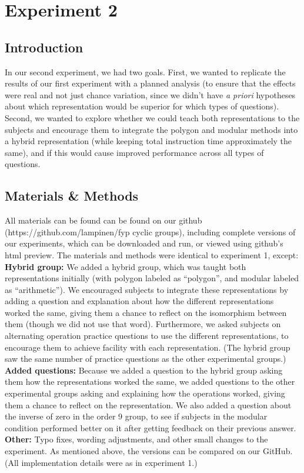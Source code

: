 \documentclass[11pt]{article}
\begin{document}
\section{Experiment 2}
\subsection{Introduction}
In our second experiment, we had two goals. First, we wanted to replicate the results of our first experiment with a planned analysis (to ensure that the effects were real and not just chance variation, since we didn't have \textit{a priori} hypotheses about which representation would be superior for which types of questions). Second, we wanted to explore whether we could teach both representations to the subjects and encourage them to integrate the polygon and modular methods into a hybrid representation (while keeping total instruction time approximately the same), and if this would cause improved performance across all types of questions. %
\subsection{Materials \& Methods} 
All materials can be found can be found on our github (https://github.com/lampinen/fyp cyclic groups), including complete versions of our experiments, which can be downloaded and run, or viewed using github's html preview. The materials and methods were identical to experiment 1, except:\\[11pt]
\textbf{Hybrid group:} We added a hybrid group, which was taught both representations initially (with polygon labeled as ``polygon'', and modular labeled as ``arithmetic''). We encouraged subjects to integrate these representations by adding a question and explanation about how the different representations worked the same, giving them a chance to reflect on the isomorphism between them (though we did not use that word). Furthermore, we asked subjects on alternating operation practice questions to use the different representations, to encourage them to achieve facility with each representation. (The hybrid group saw the same number of practice questions as the other experimental groups.)\\[11pt]
\textbf{Added questions:} Because we added a question to the hybrid group asking them how the representations worked the same, we added questions to the other experimental groups asking and explaining how the operations worked, giving them a chance to reflect on the representation. We also added a question about the inverse of zero in the order 9 group, to see if subjects in the modular condition performed better on it after getting feedback on their previous answer. \\[11pt]
\textbf{Other:} Typo fixes, wording adjustments, and other small changes to the experiment. As mentioned above, the versions can be compared on our GitHub.\\[11pt]
(All implementation details were as in experiment 1.)
\end{document}
